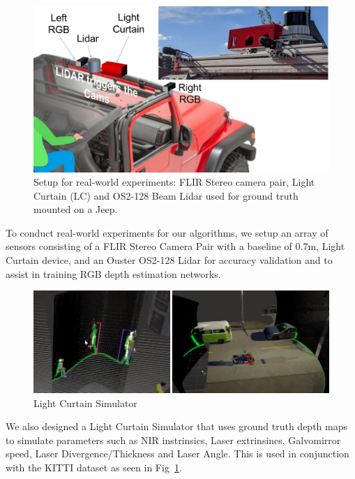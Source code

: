 \begin{figure}[h]
   \centering
   \begin{minipage}{0.5\textwidth}
       \centering
       \includegraphics[width=1.0\textwidth]{figures/array.pdf}
   \end{minipage}\hfill
   \centering
   \caption{Setup for real-world experiments: FLIR Stereo camera pair, Light Curtain (LC) and OS2-128 Beam Lidar used for ground truth mounted on a Jeep.}
\end{figure}

To conduct real-world experiments for our algorithms, we setup an array of sensors consisting of a FLIR Stereo Camera Pair with a baseline of 0.7m, Light Curtain device, and an Ouster OS2-128 Lidar for accuracy validation and to assist in training RGB depth estimation networks.

\begin{figure}[h]
   \centering
   \begin{minipage}{0.5\textwidth}
       \centering
       \includegraphics[width=1.0\textwidth]{figures/sim.png}
   \end{minipage}\hfill
   \centering
   \caption{Light Curtain Simulator}
   \label{fig:lcsimkitti} 
\end{figure}
We also designed a Light Curtain Simulator that uses ground truth depth maps to simulate parameters such as NIR instrinsics, Laser extrinsincs, Galvomirror speed, Laser Divergence/Thickness and Laser Angle. This is used in conjunction with the KITTI dataset as seen in Fig~\ref{fig:lcsimkitti}. 

